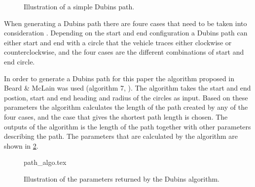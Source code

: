 \begin{figure}[!ht]
    \centering
    \caption{Illustration of a simple Dubins path.}
	\label{fig:dubins_example}
\end{figure}

When generating a Dubins path there are foure cases that need to be taken into consideration \cite{suaBEARD}. Depending on the start and end configuration a Dubins path can either start and end with a circle that the vehicle traces either clockwise or counterclockwise, and the four cases are the different combinations of start and end circle.

In order to generate a Dubins path for this paper the algorithm proposed in Beard \& McLain was used (algorithm 7, \cite{suaBEARD}). The algorithm takes the start and end postion, start and end heading and radius of the circles as input. Based on these parameters the algorithm calculates the length of the path created by any of the four cases, and the case that gives the shortest path length is chosen. The outputs of the algorithm is the length of the path together with other parameters describing the path. The parameters that are calculated by the algorithm are shown in \ref{fig:dubins_algorithm}.

\begin{figure}
	{path_algo.tex}
	\caption{Illustration of the parameters returned by the Dubins algorithm.}
	\label{fig:dubins_algorithm}
\end{figure}

